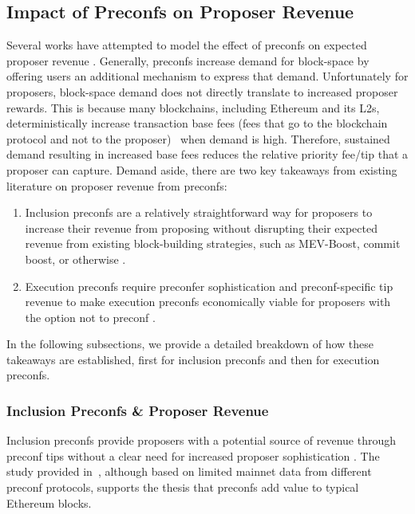 \documentclass[a4paper]{article}
\theoremstyle{boldstyle}
\begin{document}
\subsection{Impact of Preconfs on Proposer Revenue}
\label{preconfs_impact_proposer_revenue}
    
     Several works have attempted to model the effect of preconfs on expected proposer revenue \cite{W:PreconfirmationsundertheNOlens,W:EstimatingtheRevenuefromIndependentSub-SlotAuctionPreconfirmations,W:AnalysingExpectedProposerRevenuefromPreconfirmations,W:APricingModelforInclusionPreconfirmations, W:MeasuringValidatorEconomics}. Generally, preconfs increase demand for block-space by offering users an additional mechanism to express that demand. Unfortunately for proposers, block-space demand does not directly translate to increased proposer rewards. This is because many blockchains, including Ethereum and its L2s, deterministically increase transaction base fees (fees that go to the blockchain protocol and not to the proposer)~\cite{EIP1559_Economic_Analysis} when demand is high. Therefore, sustained demand resulting in increased base fees reduces the relative priority fee/tip that a proposer can capture. Demand aside, there are two key takeaways from existing literature on proposer revenue from preconfs: 
        
     \begin{enumerate}
         \item Inclusion preconfs are a relatively straightforward way for proposers to increase their revenue from proposing without disrupting their expected revenue from existing block-building strategies, such as MEV-Boost, commit boost, or otherwise \cite{W:APricingModelforInclusionPreconfirmations,W:PricingTransactionsforPreconfirmation}.
         \item Execution preconfs require preconfer sophistication and preconf-specific tip revenue to make execution preconfs economically viable for proposers with the option not to preconf \cite{W:PreconfirmationsundertheNOlens,W:EstimatingtheRevenuefromIndependentSub-SlotAuctionPreconfirmations,W:AnalysingExpectedProposerRevenuefromPreconfirmations}. 
     \end{enumerate}

    In the following subsections, we provide a detailed breakdown of how these takeaways are established, first for inclusion preconfs and then for execution preconfs. 
    
    \subsubsection{Inclusion Preconfs \& Proposer Revenue}
\label{inclusion_revenue}
    Inclusion preconfs provide proposers with a potential source of revenue through preconf tips without a clear need for increased proposer sophistication
    \cite{W:APricingModelforInclusionPreconfirmations, W:PricingTransactionsforPreconfirmation, W:MeasuringValidatorEconomics}. The study provided in~\cite{W:MeasuringValidatorEconomics}, although based on limited mainnet data from different preconf protocols, supports the thesis that preconfs add value to typical Ethereum blocks.
    
\end{document}
